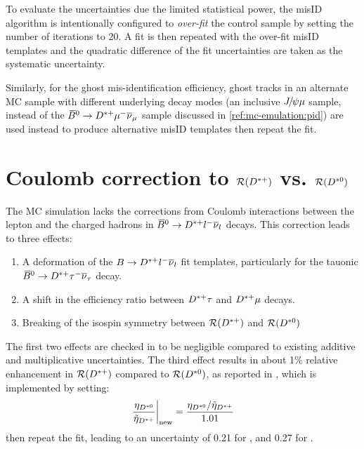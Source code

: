 To evaluate the uncertainties due the limited statistical power,
the misID algorithm is intentionally configured to \emph{over-fit} the control
sample by setting the number of iterations to 20.
A fit is then repeated with the over-fit misID templates and the quadratic
difference of the fit uncertainties are taken as the systematic uncertainty.

Similarly, for the ghost mis-identification efficiency,
ghost tracks in an alternate MC sample with different underlying decay modes
(an inclusive ${{J\mskip -3mu/\mskip -2mu\psi}}{\mu}$ sample,
instead of the ${{\kern 0.18em\overline{\kern -0.18em B}}{}^0} \rightarrow {\ensuremath{{D}^{*+}}} {\ensuremath{\mu^-}}{\ensuremath{{\overline{\nu}}_\mu}}$ sample discussed in
\cref{ref:mc-emulation:pid})
are used instead to produce alternative misID templates then repeat the fit.


\section{Coulomb correction to $\mathcal{R}({{D}^{*+}})$ vs. $\mathcal{R}({{D}^{*0}})$}
\label{sys-theory-coulomb}

The MC simulation lacks the corrections from Coulomb interactions between
the lepton and the charged hadrons in
${{\kern 0.18em\overline{\kern -0.18em B}}{}^0} \rightarrow {\ensuremath{{D}^{*+}}}{\ensuremath{l^-}}{\ensuremath{{\overline{\nu}}_l}}$ decays.
This correction leads to three effects:

\begin{enumerate}
    \item A deformation of the
        $B \rightarrow {\ensuremath{{D}^{*+}}}{\ensuremath{l^-}}{\ensuremath{{\overline{\nu}}_l}}$ fit templates,
        particularly for the tauonic
        ${{\kern 0.18em\overline{\kern -0.18em B}}{}^0} \rightarrow {\ensuremath{{D}^{*+}}}{\ensuremath{\tau^-}}{\ensuremath{{\overline{\nu}}_\tau}}$ decay.
    \item A shift in the efficiency ratio between ${{D}^{*+}}\tau$ and ${{D}^{*+}}\mu$
        decays.
    \item Breaking of the isospin symmetry between
        $\mathcal{R}({{D}^{*+}})$ and $\mathcal{R}({{D}^{*0}})$
\end{enumerate}

The first two effects are checked in \cite{LHCb-ANA-2020-056} to be negligible
compared to existing additive and multiplicative uncertainties.
The third effect results in about 1\% relative enhancement in $\mathcal{R}
({{D}^{*+}})$ compared to $\mathcal{R}({{D}^{*0}})$,
as reported in \cite{Cal__2019},
which is implemented by setting:
\begin{equation}
    \left.\frac{{\eta}_{{{D}^{*0}}}}{\tilde{\eta}_{{{D}^{*+}}}}\right|_\text{new} =
    \frac{{\eta}_{{{D}^{*0}}} / \tilde{\eta}_{{{D}^{*+}}}}{1.01}
\end{equation}
then repeat the fit,
leading to an uncertainty of 0.21 for \RD,
and 0.27 for \RDst.

